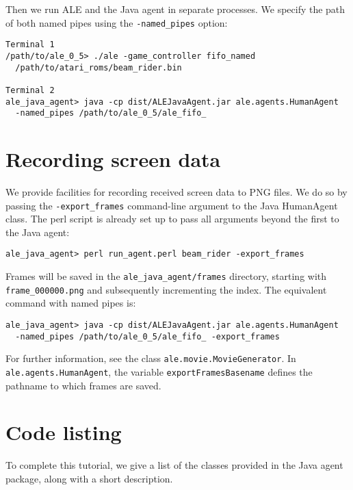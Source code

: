 \documentclass[12pt]{article}
\begin{document}
Then we run ALE and the Java agent in separate processes. We specify the path
of both named pipes using the \verb+-named_pipes+ option:

\begin{verbatim}
Terminal 1
/path/to/ale_0_5> ./ale -game_controller fifo_named 
  /path/to/atari_roms/beam_rider.bin

Terminal 2
ale_java_agent> java -cp dist/ALEJavaAgent.jar ale.agents.HumanAgent 
  -named_pipes /path/to/ale_0_5/ale_fifo_
\end{verbatim}

\section{Recording screen data}

We provide facilities for recording received screen data to PNG files. We do
so by passing the \verb+-export_frames+ command-line argument to the Java
HumanAgent class. The perl script is already set up to pass all arguments 
beyond the first to the Java agent:

\begin{verbatim}
ale_java_agent> perl run_agent.perl beam_rider -export_frames
\end{verbatim}

Frames will be saved in the \verb+ale_java_agent/frames+ directory, starting
with \verb+frame_000000.png+ and subsequently incrementing the index. The
equivalent command with named pipes is:

\begin{verbatim}
ale_java_agent> java -cp dist/ALEJavaAgent.jar ale.agents.HumanAgent 
  -named_pipes /path/to/ale_0_5/ale_fifo_ -export_frames
\end{verbatim}

For further information, see the class \verb+ale.movie.MovieGenerator+. In
\verb+ale.agents.HumanAgent+, the variable \verb+exportFramesBasename+ defines
the pathname to which frames are saved.

\section{Code listing}

To complete this tutorial, we give a list of the classes provided in the
Java agent package, along with a short description.
\end{document}
